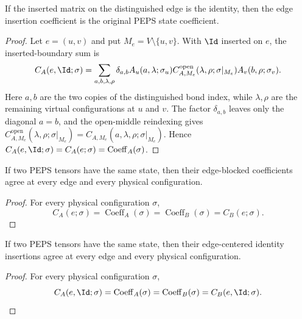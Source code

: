 \begin{theorem}%
    \label{thm:peps_edgeInsertedCoeff_identity_eq_stateCoeff}
    \leanok
    If the inserted matrix on the distinguished edge is the identity, then the
    edge insertion coefficient is the original PEPS state coefficient.
\end{theorem}
\begin{proof}\leanok
    Let $e=(u,v)$ and put $M_e=V\setminus\{u,v\}$. With $\Id$ inserted on $e$, the
    inserted-boundary sum is
    \[
        C_A(e,\Id;\sigma)
        =
        \sum_{a,b,\lambda,\rho}
        \delta_{a,b}
        A_u(a,\lambda;\sigma_u)
        C^{\mathrm{open}}_{A,M_e}(\lambda,\rho;\sigma|_{M_e})
        A_v(b,\rho;\sigma_v).
    \]
    Here $a,b$ are the two copies of the distinguished bond index, while
    $\lambda,\rho$ are the remaining virtual configurations at $u$ and $v$.
    The factor $\delta_{a,b}$
    leaves only the diagonal $a=b$, and the open-middle reindexing gives
    $C^{\mathrm{open}}_{A,M_e}(\lambda,\rho;\sigma|_{M_e})
        =C_{A,M_e}(a,\lambda,\rho;\sigma|_{M_e})$. Hence
    $C_A(e,\Id;\sigma)=C_A(e;\sigma)=\operatorname{Coeff}_A(\sigma)$.
\end{proof}

\begin{theorem}%
    \label{thm:peps_sameState_edgeBlockedCoeff_eq}
    \leanok
    If two PEPS tensors have the same state, then their edge-blocked
    coefficients agree at every edge and every physical configuration.
\end{theorem}
\begin{proof}\leanok
    For every physical configuration $\sigma$,
    \[
        C_A(e;\sigma)
        =
        \operatorname{Coeff}_A(\sigma)
        =
        \operatorname{Coeff}_B(\sigma)
        =
        C_B(e;\sigma).
    \]
\end{proof}

\begin{theorem}%
    \label{thm:peps_sameState_edgeInsertedCoeff_identity_eq}
    \leanok
    If two PEPS tensors have the same state, then their edge-centered identity
    insertions agree at every edge and every physical configuration.
\end{theorem}
\begin{proof}\leanok
    For every physical configuration $\sigma$,
    \[
        C_A(e,\Id;\sigma)
        =
        \operatorname{Coeff}_A(\sigma)
        =
        \operatorname{Coeff}_B(\sigma)
        =
        C_B(e,\Id;\sigma).
    \]
\end{proof}

